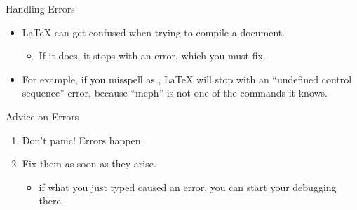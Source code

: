 \documentclass{beamer}
\begin{document}
\begin{frame}[fragile]{Handling Errors}
\begin{itemize}
\item \LaTeX{} can get confused when trying to compile a document. 
\begin{itemize}
\item If it does, it stops with an error, which you must fix.
\end{itemize}
\item For example, if you misspell  as , \LaTeX{} will
stop with an ``undefined control sequence'' error, because ``meph'' is not
one of the commands it knows.
\end{itemize}
\begin{block}{Advice on Errors}
\begin{enumerate}
\item Don't panic! Errors happen.
\item Fix them as soon as they arise. 
\begin{itemize}
  \item if what you just typed caused an error, you can start your debugging there.
\end{itemize}
\end{enumerate}
\end{block}
\end{frame}
\end{document}
